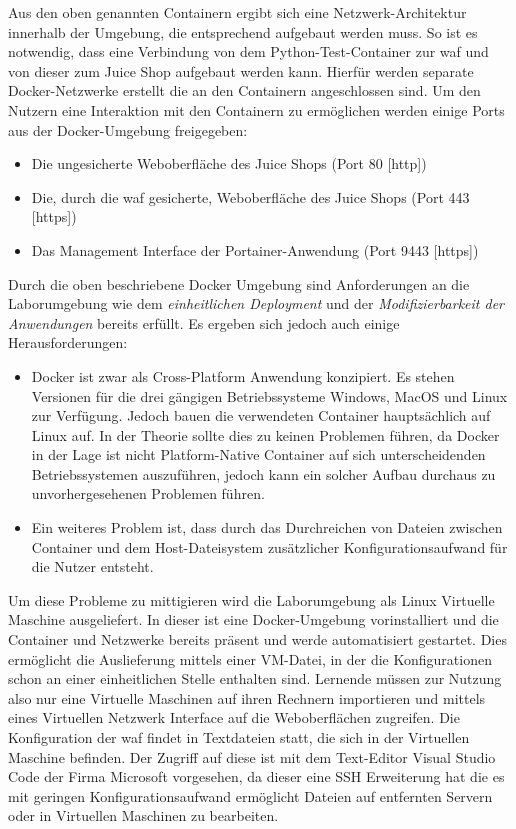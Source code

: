 Aus den oben genannten Containern ergibt sich eine Netzwerk-Architektur innerhalb der Umgebung, die entsprechend aufgebaut werden muss.
So ist es notwendig, dass eine Verbindung von dem Python-Test-Container zur \ac{waf} und von dieser zum Juice Shop aufgebaut werden kann.
Hierfür werden separate Docker-Netzwerke erstellt die an den Containern angeschlossen sind.
Um den Nutzern eine Interaktion mit den Containern zu ermöglichen werden einige Ports aus der Docker-Umgebung freigegeben:

\begin{itemize}
    \item Die ungesicherte Weboberfläche des Juice Shops (Port 80 [\ac{http}])
    \item Die, durch die \ac{waf} gesicherte, Weboberfläche des Juice Shops (Port 443 [\ac{https}])
    \item Das Management Interface der Portainer-Anwendung (Port 9443 [\ac{https}])
\end{itemize}

Durch die oben beschriebene Docker Umgebung sind Anforderungen an die Laborumgebung wie dem \textit{einheitlichen Deployment} und der \textit{Modifizierbarkeit der Anwendungen} bereits erfüllt.
Es ergeben sich jedoch auch einige Herausforderungen:

\begin{itemize}
    \item Docker ist zwar als Cross-Platform Anwendung konzipiert.
    Es stehen Versionen für die drei gängigen Betriebssysteme Windows, MacOS und Linux zur Verfügung.
    Jedoch bauen die verwendeten Container hauptsächlich auf Linux auf.
    In der Theorie sollte dies zu keinen Problemen führen, da Docker in der Lage ist nicht Platform-Native Container auf sich unterscheidenden Betriebssystemen auszuführen, jedoch kann ein solcher Aufbau durchaus zu unvorhergesehenen Problemen führen.
    \item Ein weiteres Problem ist, dass durch das Durchreichen von Dateien zwischen Container und dem Host-Dateisystem zusätzlicher Konfigurationsaufwand für die Nutzer entsteht.
\end{itemize}

Um diese Probleme zu mittigieren wird die Laborumgebung als Linux Virtuelle Maschine ausgeliefert.
In dieser ist eine Docker-Umgebung vorinstalliert und die Container und Netzwerke bereits präsent und werde automatisiert gestartet.
Dies ermöglicht die Auslieferung mittels einer VM-Datei, in der die Konfigurationen schon an einer einheitlichen Stelle enthalten sind.
Lernende müssen zur Nutzung also nur eine Virtuelle Maschinen auf ihren Rechnern importieren und mittels eines Virtuellen Netzwerk Interface auf die Weboberflächen zugreifen.
Die Konfiguration der \ac{waf} findet in Textdateien statt, die sich in der Virtuellen Maschine befinden.
Der Zugriff auf diese ist mit dem Text-Editor Visual Studio Code der Firma Microsoft vorgesehen, da dieser eine SSH Erweiterung hat die es mit geringen Konfigurationsaufwand ermöglicht Dateien auf entfernten Servern oder in Virtuellen Maschinen zu bearbeiten.

